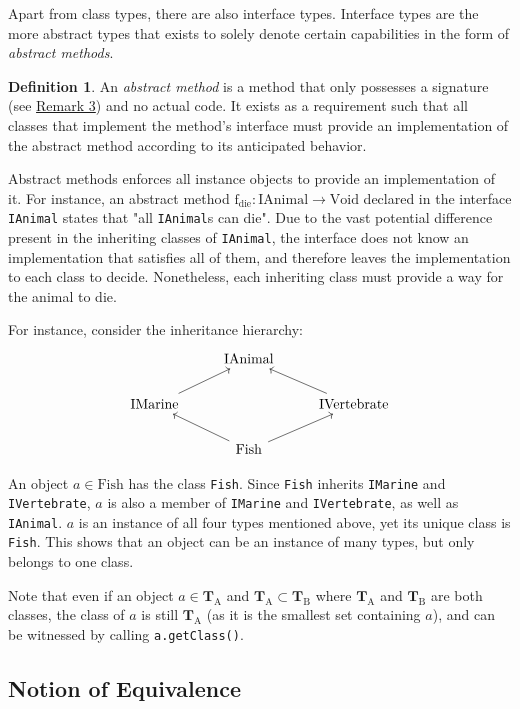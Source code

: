 \documentclass[12pt]{article}
\theoremstyle{definition}
\newtheorem{defn}{Definition}[section]
\newcommand{\code}[1]{\colorbox{codegray}{\texttt{#1}}}
\newcommand{\ttype}[1]{\text{#1}}
\newcommand{\gtype}[1]{\textbf{T}_\text{#1}}
\begin{document}
	Apart from class types, there are also interface types. Interface types are the more abstract types that exists to solely denote certain capabilities in the form of \emph{abstract methods}.
	
	\begin{defn}
		An \emph{abstract method} is a method that only possesses a signature (see \hyperref[sec:signature]{Remark 3}) and no actual code. It exists as a requirement such that all classes that implement the method's interface must provide an implementation of the abstract method according to its anticipated behavior.
	\end{defn}
	
	Abstract methods enforces all instance objects to provide an implementation of it. For instance, an abstract method $\text{f}_\text{die}	: \ttype{IAnimal} \to \ttype{Void}$ declared in the interface \code{IAnimal} states that "all \code{IAnimal}s can die". Due to the vast potential difference present in the inheriting classes of \code{IAnimal}, the interface does not know an implementation that satisfies all of them, and therefore leaves the implementation to each class to decide. Nonetheless, each inheriting class must provide a way for the animal to die.
	
	For instance, consider the inheritance hierarchy:
	\begin{equation*}\begin{tikzcd}
		& \ttype{IAnimal}\\
		\ttype{IMarine} \ar[ru] && \ttype{IVertebrate} \ar[lu] \\
		& \ttype{Fish} \ar[lu] \ar[ru]
	\end{tikzcd}\end{equation*}
	
	An object $a \in \ttype{Fish}$ has the class \code{Fish}. Since \code{Fish} inherits \code{IMarine} and \code{IVertebrate}, $a$ is also a member of \code{IMarine} and \code{IVertebrate}, as well as \code{IAnimal}. $a$ is an instance of all four types mentioned above, yet its unique class is \code{Fish}. This shows that an object can be an instance of many types, but only belongs to one class.
	
	Note that even if an object $a \in \gtype{A}$ and $\gtype{A} \subset \gtype{B}$ where $\gtype{A}$ and $\gtype{B}$ are both classes, the class of $a$ is still $\gtype{A}$ (as it is the smallest set containing $a$), and can be witnessed by calling \code{a.getClass()}.
	
	\subsection{Notion of Equivalence}
	
\end{document}
